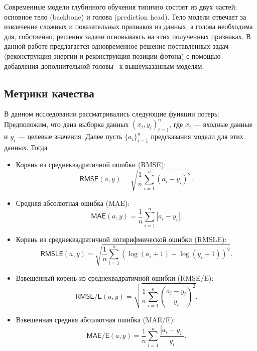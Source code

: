 \documentclass[a4paper,12pt]{extarticle}
\begin{document}
Современные модели глубинного обучения типично состоят из двух частей: основное тело (backbone) и голова (prediction head). Тело модели отвечает за извлечение сложных и показательных признаков из данных, а голова необходима для, собственно, решения задачи основываясь на этих полученных признаках. В данной работе предлагается одновременное решение поставленных задач (реконструкция энергии и реконструкция позиции фотона) с помощью добавления дополнительной головы~\cite{kendall2018multitask, zhang2021survey} к вышеуказанным моделям.

\subsection{Метрики качества}
\label{subsection:metrics}

В данном исследовании рассматривались следующие функции потерь: Предположим, что дана выборка данных $(x_i, y_i)_{i = 1}^{n}$, где $x_i$ --- входные данные и $y_i$ --- целевые значения. Далее пусть $\{ a_i \}_{i = 1}^{n}$ предсказания модели для этих данных. Тогда

\begin{itemize}
    \item Корень из среднеквадратичной ошибки (\textsf{RMSE}): \[ \textsf{RMSE}(a, y) = \sqrt{\frac{1}{n} \sum_{i = 1}^{n} (a_i - y_i)^2} . \]
    \item Средняя абсолютная ошибка (\textsf{MAE}): \[ \textsf{MAE}(a, y) = \frac{1}{n} \sum_{i = 1}^{n} |a_i - y_i| . \]
    \item Корень из среднеквадратичной логирифмической ошибки (\textsf{RMSLE}): \[ \textsf{RMSLE}(a, y) = \sqrt{\frac{1}{n} \sum_{i = 1}^{n} (\log(a_i + 1) - \log(y_i + 1))^2} . \]
    \item Взвешенный корень из среднеквадратичной ошибки (\textsf{RMSE/E}): \[ \textsf{RMSE/E}(a, y) = \sqrt{\frac{1}{n} \sum_{i = 1}^{n} \left( \frac{a_i - y_i}{y_i} \right)^2} . \]
    \item Взвешенная средняя абсолютная ошибка (\textsf{MAE/E}): \[ \textsf{MAE/E}(a, y) = \frac{1}{n} \sum_{i = 1}^{n} \frac{|a_i - y_i|}{y_i} . \]
\end{itemize}
\end{document}
